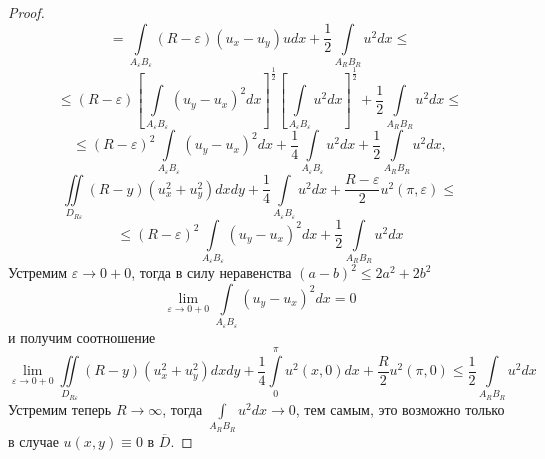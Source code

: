\documentclass[a4paper, 11pt]{article}
\begin{document}
\begin{proof}
\begin{equation*}
	\end{equation*}
	\begin{equation*}
		= \int\limits_{A_\varepsilon B_\varepsilon} \left(R - \varepsilon \right) \left(u_x - u_y\right)u dx + \dfrac12  \int\limits_{A_R B_R} u^2 dx \leq
	\end{equation*}
	\begin{equation*}
		\leq \left(R - \varepsilon\right) \left[\int\limits_{A_\varepsilon B_\varepsilon} \left( u_y - u_x\right)^2 dx \right]^{\frac12} \left[\int\limits_{A_\varepsilon B_\varepsilon} u^2 dx \right]^{\frac12} + \dfrac12 \int\limits_{A_RB_R} u^2 dx \leq
	\end{equation*}
	\begin{equation*}
		\leq \left(R - \varepsilon\right)^2 \int\limits_{A_\varepsilon B_\varepsilon} \left( u_y - u_x\right)^2 dx + \dfrac14 \int\limits_{A_\varepsilon B_\varepsilon} u^2 dx +\dfrac12 \int\limits_{A_RB_R} u^2 dx, 
	\end{equation*}
	\begin{equation*}
		\iint\limits_{D_{R\varepsilon}} \left(R - y\right) \left(u_x^2 + u_y^2\right) dx dy + \dfrac{1}{4}\int\limits_{A_\varepsilon B_\varepsilon} u^2 dx +\dfrac{R - \varepsilon}{2}u^2(\pi, \varepsilon) \leq 
	\end{equation*}
	\begin{equation*}
		\leq \left(R - \varepsilon\right)^2 \int\limits_{A_\varepsilon B_\varepsilon} \left( u_y - u_x\right)^2 dx  +\dfrac12 \int\limits_{A_RB_R} u^2 dx
	\end{equation*}
	Устремим $\varepsilon \to 0 + 0$, тогда в силу неравенства $(a-b)^2 \leq 2a^2 + 2b^2$
	\begin{equation*}
		\lim\limits_{\varepsilon \to 0 + 0} \int\limits_{A_\varepsilon B_\varepsilon} \left(u_y - u_x\right)^2 dx = 0
	\end{equation*}
	и получим соотношение
	\begin{equation*}
		\lim\limits_{\varepsilon \to 0 + 0} \iint\limits_{D_{R\varepsilon}} \left(R - y\right) \left(u_x^2 + u_y^2 \right) dx dy + \dfrac14 \int\limits_0^\pi u^2(x,0) dx + \dfrac{R}{2}u^2(\pi,0) \leq \dfrac12 \int\limits_{A_RB_R} u^2 dx
	\end{equation*}
	Устремим теперь $R \to \infty$, тогда $\int\limits_{A_RB_R} u^2 dx \to 0$, тем самым, это возможно только в случае $u(x,y) \equiv 0$ в $\overline{D}$.
\end{proof}
\newpage
{}
\vspace{-2.3cm}
\renewcommand{\refname}{\begin{center}
{\normalsize \rm СПИСОК ЛИТЕРАТУРЫ} \end{center}}
\end{document}

